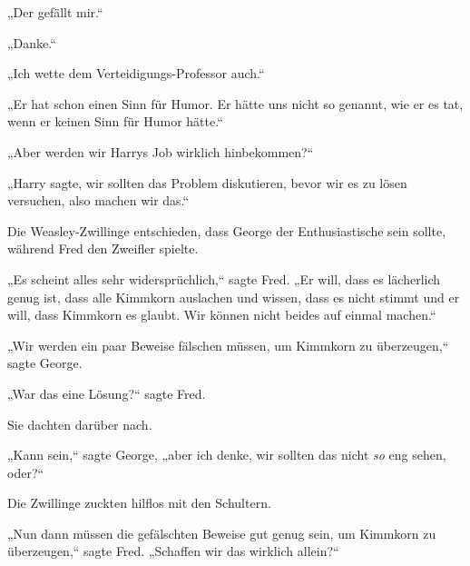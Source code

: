 „Der gefällt mir.“

„Danke.“

„Ich wette dem Verteidigungs-Professor auch.“

„Er hat schon einen Sinn für Humor. Er hätte uns nicht so genannt, wie er es tat, wenn er keinen Sinn für Humor hätte.“

„Aber werden wir Harrys Job wirklich hinbekommen?“

„Harry sagte, wir sollten das Problem diskutieren, bevor wir es zu lösen versuchen, also machen wir das.“

Die Weasley-Zwillinge entschieden, dass George der Enthusiastische sein sollte, während Fred den Zweifler spielte.

„Es scheint alles sehr widersprüchlich,“ sagte Fred. „Er will, dass es lächerlich genug ist, dass alle Kimmkorn auslachen und wissen, dass es nicht stimmt und er will, dass Kimmkorn es glaubt. Wir können nicht beides auf einmal machen.“

„Wir werden ein paar Beweise fälschen müssen, um Kimmkorn zu überzeugen,“ sagte George.

„War das eine Lösung?“ sagte Fred.

Sie dachten darüber nach.

„Kann sein,“ sagte George, „aber ich denke, wir sollten das nicht \emph{so} eng sehen, oder?“

Die Zwillinge zuckten hilflos mit den Schultern.

„Nun dann müssen die gefälschten Beweise gut genug sein, um Kimmkorn zu überzeugen,“ sagte Fred. „Schaffen wir das wirklich allein?“

